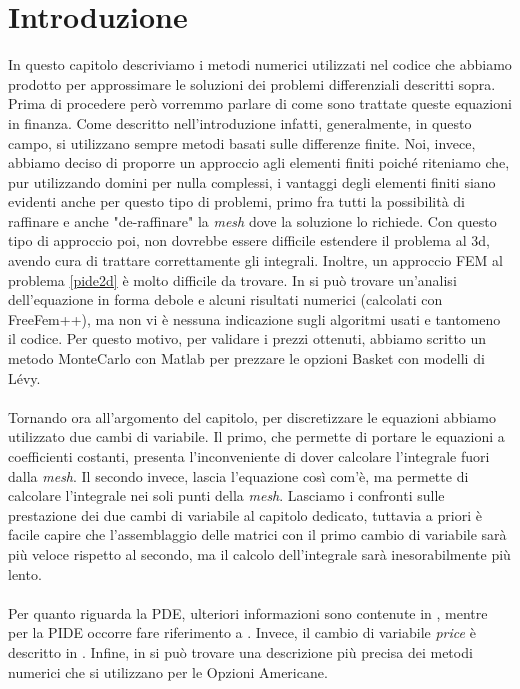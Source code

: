 \documentclass[a4paper,10pt]{report}
\theoremstyle{plain}
\theoremstyle{definition}
\theoremstyle{remark}
\begin{document}
\section{Introduzione}
In questo capitolo descriviamo i metodi numerici utilizzati nel codice che abbiamo prodotto per approssimare le soluzioni dei problemi differenziali descritti sopra. Prima di procedere per\`o vorremmo parlare di come sono trattate queste equazioni in finanza. Come descritto nell'introduzione infatti, generalmente, in questo campo, si utilizzano sempre metodi basati sulle differenze finite. Noi, invece, abbiamo deciso di proporre un approccio agli elementi finiti poich\'e riteniamo che, pur utilizzando domini per nulla complessi, i vantaggi degli elementi finiti siano evidenti anche per questo tipo di problemi, primo fra tutti la possibilit\`a di raffinare e anche "de-raffinare" la \emph{mesh} dove la soluzione lo richiede. Con questo tipo di approccio poi, non dovrebbe essere difficile estendere il problema al 3d, avendo cura di trattare correttamente gli integrali. Inoltre, un approccio FEM al problema \ref{pide2d} è molto difficile da trovare. In \cite{jinghui2009multi} si può trovare un'analisi dell'equazione in forma debole e alcuni risultati numerici (calcolati con \textsf{FreeFem++}), ma non vi è nessuna indicazione sugli algoritmi usati e tantomeno il codice. Per questo motivo, per validare i prezzi ottenuti, abbiamo scritto un metodo MonteCarlo con \textsf{Matlab} per prezzare le opzioni Basket con modelli di L\'evy.\\\\Tornando ora all'argomento del capitolo, per discretizzare le equazioni abbiamo utilizzato due cambi di variabile. Il primo, che permette di portare le equazioni a coefficienti costanti, presenta l'inconveniente di dover calcolare l'integrale fuori dalla \emph{mesh}. Il secondo invece, lascia l'equazione cos\`i com'\`e, ma permette di calcolare l'integrale nei soli punti della \emph{mesh}. Lasciamo i confronti sulle prestazione dei due cambi di variabile al capitolo dedicato, tuttavia a priori \`e facile capire che l'assemblaggio delle matrici con il primo cambio di variabile sar\`a pi\`u veloce rispetto al secondo, ma il calcolo dell'integrale sar\`a inesorabilmente pi\`u lento.\\\\Per quanto riguarda la PDE, ulteriori informazioni sono contenute in \cite{seydel2002tools}, mentre per la PIDE occorre fare riferimento a \cite{tankov2003financial}. Invece, il cambio di variabile \emph{price} \`e descritto in \cite{achdou2005computational}. Infine, in \cite{feng2011solution} si pu\`o trovare una descrizione pi\`u precisa dei metodi numerici che si utilizzano per le Opzioni Americane.
\end{document}
